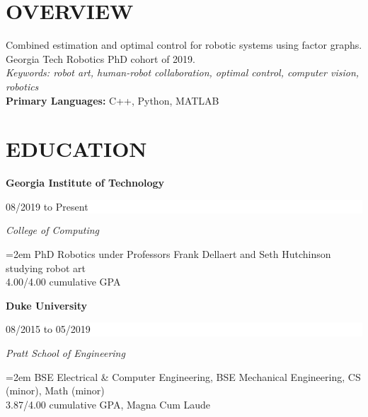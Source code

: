 \documentclass[paper=letter,fontsize=11pt]{scrartcl} %
\newcommand{\sepspace}{\vspace*{0em}}		%
\newcommand{\NewPart}[2]{\section*{\uppercase{#1} #2}}
\newcommand{\EducationEntry}[4]{
		\noindent \textbf{#1} \hfill      %
		\colorbox{White}{%
			\bf 
			\parbox{10em}{%
			\hfill\color{Black}#2}} \par  %
		\noindent \textit{#3} \par        %
		\noindent\hangindent=2em\hangafter=0 \small #4 %
		\normalsize \par}
\begin{document}
 \NewPart{Overview}{}
	Combined estimation and optimal control for robotic systems using factor graphs.\\
	Georgia Tech Robotics PhD cohort of 2019.\\
 \textit{Keywords: robot art, human-robot collaboration, optimal control, computer vision, robotics}
\\ \textbf{Primary Languages:} C++, Python, MATLAB


\NewPart{Education}{}

\EducationEntry{Georgia Institute of Technology}{08/2019 to Present}{College of Computing}
	{PhD Robotics under Professors Frank Dellaert and Seth Hutchinson studying robot art\\4.00/4.00 cumulative GPA}

\EducationEntry{Duke University}{08/2015 to 05/2019}{Pratt School of Engineering}{BSE Electrical \& Computer Engineering, BSE Mechanical Engineering, CS (minor), Math (minor)\\
3.87/4.00 cumulative GPA, Magna Cum Laude}
\end{document}
